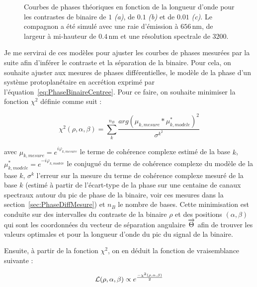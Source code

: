 \begin{figure}[ht!]
\begin{subfigure}{0.5\textwidth}
        \caption{}
        \label{fig:PhaseDiffWaveSimuleC}
    \end{subfigure}
    \caption[Courbes de phases théoriques en fonction de la longueur d'onde pour plusieurs contrastes de binaire.]{Courbes de phases théoriques en fonction de la longueur d'onde pour les contrastes de binaire de $1$ \textit{(a)}, de $0.1$ \textit{(b)} et de $0.01$ \textit{(c)}. Le compagnon a été simulé avec une raie d'émission à $656 \,$nm, de largeur à mi-hauteur de $0.4 \,$nm et une résolution spectrale de $3200$.}
    \label{fig:PhaseDiffWaveSimule}
\end{figure}

Je me servirai de ces modèles pour ajuster les courbes de phases mesurées par la suite afin d'inférer le contraste et la séparation de la binaire. Pour cela, on souhaite ajuster aux mesures de phases différentielles, le modèle de la phase d'un système protoplanétaire en accrétion exprimé par l'équation~\ref{eq:PhaseBinaireCentree}. Pour ce faire, on souhaite minimiser la fonction $\chi^2$ définie comme suit :

\begin{equation}
    \chi^2 (\rho, \alpha, \beta) = \sum_{k}^{n_B} \frac{arg(\mu_{k, mesure}^{} * \mu_{k, modele}^{*})^2}{\sigma^{k^2}}
    \label{eq:chi2}
\end{equation}

\noindent avec $\mu_{k, mesure}^{} = e^{i\varphi_{k, mesure}}$ le terme de cohérence complexe estimé de la base $k$, $\mu_{k, modele}^{*} = e^{-i\varphi_{k, modele}}$ le conjugué du terme de cohérence complexe du modèle de la base $k$, $\sigma^{k}$ l'erreur sur la mesure du terme de cohérence complexe mesuré de la base $k$ (estimé à partir de l'écart-type de la phase sur une centaine de canaux spectraux autour du pic de phase de la binaire, voir ces mesures dans la section~\ref{sec:PhaseDiffMesure}) et $n_B$ le nombre de bases. Cette minimisation est conduite sur des intervalles du contraste de la binaire $\rho$ et des positions $(\alpha, \beta)$ qui sont les coordonnées du vecteur de séparation angulaire $\overrightarrow{\Theta}$ afin de trouver les valeurs optimales et pour la longueur d'onde du pic du signal de la binaire.

Ensuite, à partir de la fonction $\chi^2$, on en déduit la fonction de vraisemblance suivante :

\begin{equation}
    \mathcal{L} (\rho, \alpha, \beta) \propto e^{\frac{-\chi^2 (\rho, \alpha, \beta)}{2}}
\end{equation}

